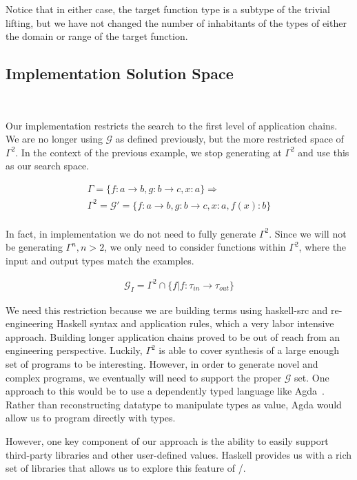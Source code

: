 Notice that in either case, the target function type is a subtype of the trivial lifting, but we have not changed the number of inhabitants of the types of either the domain or range of the target function.

\subsection{Implementation Solution Space}\label{solnSpace}\

Our implementation restricts the search to the first level of application chains.
We are no longer using $\mathcal{G}$ as defined previously, but the more restricted space of $\Gamma^2$.
In the context of the previous example, we stop generating at $\Gamma^2$ and use this as our search space.

\begin{gather*}
\Gamma = \{f:a\to b, g:b\to c, x:a\} \Rightarrow \\
\Gamma^2 = \mathcal{G}' = \{f:a\to b, g:b\to c, x:a, f(x):b\}\\
\end{gather*}

In fact, in implementation we do not need to fully generate $\Gamma^2$.
Since we will not be generating $\Gamma^n, n>2$, we only need to consider functions within $\Gamma^2$, where the input and output types match the examples.

\begin{gather*}
\mathcal{G}_I = \Gamma^2 \cap \{f | f : \tau_{in} \to \tau_{out}\}
\end{gather*}

We need this restriction because we are building terms using haskell-src and re-engineering Haskell syntax and application rules, which a very labor intensive approach.
Building longer application chains proved to be out of reach from an engineering perspective.
Luckily, $\Gamma^2$ is able to cover synthesis of a large enough set of programs to be interesting.
However, in order to generate novel and complex programs, we eventually will need to support the proper $\mathcal{G}$ set.
One approach to this would be to use a dependently typed language like Agda~\cite{agda}.
Rather than reconstructing datatype to manipulate types as value, Agda would allow us to program directly with types.

However, one key component of our approach is the ability to easily support third-party libraries and other user-defined values.
Haskell provides us with a rich set of libraries that allows us to explore this feature of \ourTool/.

